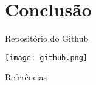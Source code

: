 \section{Conclusão}

\begin{frame}{Repositório do Github}
\begin{center}
        \href{https://github.com/lucasamtaylor01/Lorenz80/blob/master/01_src/simulacoes.ipynb}{
        \texttt{[image: github.png]}}
\end{center}

\end{frame}
\begin{frame}[allowframebreaks]{Referências}
    \nocite{*}
    \printbibliography[heading=none]
\end{frame}